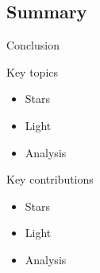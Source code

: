 
\subsection{Summary}

\begin{frame}{Conclusion}

Key topics
\begin{itemize}
    \item Stars
    \item Light
    \item Analysis
\end{itemize}
\bigskip
Key contributions
\begin{itemize}
    \item Stars
    \item Light
    \item Analysis
\end{itemize}
\end{frame}
